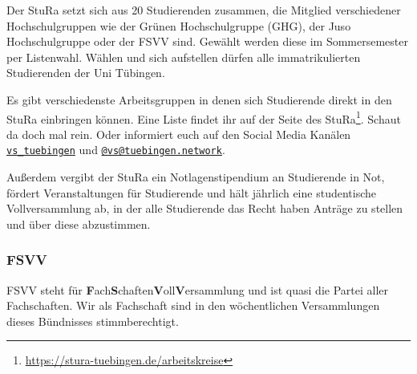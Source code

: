 Der StuRa setzt sich aus 20 Studierenden zusammen, die Mitglied verschiedener Hochschulgruppen wie der Grünen Hochschulgruppe (GHG), der Juso Hochschulgruppe
oder der FSVV sind. Gewählt werden diese im Sommersemester per Listenwahl. Wählen und sich aufstellen dürfen alle immatrikulierten Studierenden der Uni Tübingen.

Es gibt verschiedenste Arbeitsgruppen in denen sich Studierende direkt in den StuRa einbringen können. 
Eine Liste findet ihr auf der Seite des StuRa\footnote{\url{https://stura-tuebingen.de/arbeitskreise}}. 
Schaut da doch mal rein. Oder informiert euch auf den Social Media Kanälen 
\href{https://www.instagram.com/vs\_tuebingen}{\texttt{vs\_tuebingen}}
und \href{https://toot.kif.rocks/@vs@tuebingen.network}{\texttt{@vs@tuebingen.network}}.


Außerdem vergibt der StuRa ein Notlagenstipendium an Studierende in Not, fördert
Veranstaltungen für Studierende und hält jährlich eine studentische Vollversammlung
ab, in der alle Studierende das Recht haben Anträge zu stellen und über diese abzustimmen.



\subsubsection{FSVV}
FSVV steht für \textbf{F}ach\textbf{S}chaften\textbf{V}oll\textbf{V}ersammlung und ist
quasi die Partei aller Fachschaften. Wir als Fachschaft sind in den wöchentlichen Versammlungen dieses Bündnisses stimmberechtigt.

